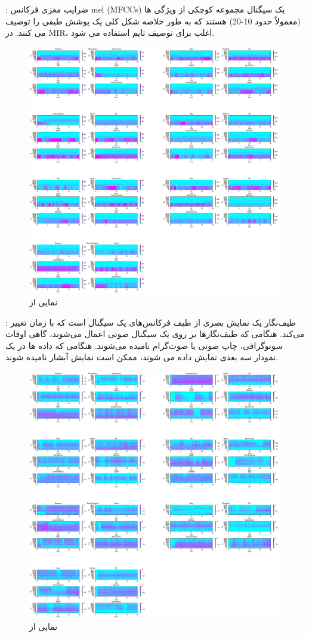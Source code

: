 \documentclass{article}
\begin{document}
 : \newline
ضرایب مغزی فرکانس mel (MFCCs) یک سیگنال مجموعه کوچکی از ویژگی ها (معمولاً حدود 10-20) هستند که به طور خلاصه شکل کلی یک پوشش طیفی را توصیف می کنند. در MIR، اغلب برای توصیف تایم استفاده می شود.
\begin{figure}[h]
	\centering
	\includegraphics[width=0.5\linewidth]{Photo/32}
	\caption[نمایی از ]{نمایی از }
	\label{fig:32}
\end{figure}




 : \newline
طیف‌نگار یک نمایش بصری از طیف فرکانس‌های یک سیگنال است که با زمان تغییر می‌کند. هنگامی که طیف‌نگارها بر روی یک سیگنال صوتی اعمال می‌شوند، گاهی اوقات سونوگرافی، چاپ صوتی یا صوت‌گرام نامیده می‌شوند. هنگامی که داده ها در یک نمودار سه بعدی نمایش داده می شوند، ممکن است نمایش آبشار نامیده شوند.
\begin{figure}[h]
	\centering
	\includegraphics[width=0.5\linewidth]{Photo/34}
	\caption[نمایی از ]{نمایی از }
	\label{fig:34}
\end{figure}
\end{document}
